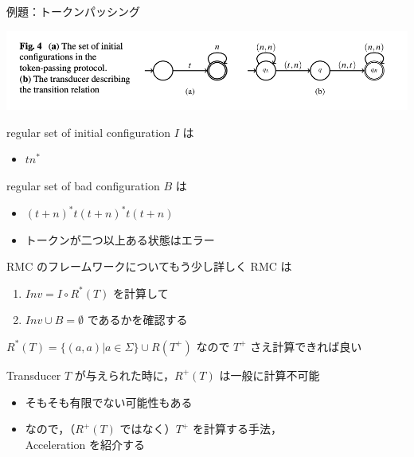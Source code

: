 \documentclass[presentation, xetex]{beamer}
\begin{document}
\begin{frame}[label={sec:org3bc9293}]{例題：トークンパッシング}
\begin{center}
\includegraphics[width=.9\linewidth]{./images/token-example.png}
\end{center}


regular set of initial configuration \(I\) は
\begin{itemize}
\item \(t n^*\)
\end{itemize}


regular set of bad configuration \(B\) は
\begin{itemize}
\item \((t + n)^* t (t + n)^* t (t + n)\)
\item トークンが二つ以上ある状態はエラー
\end{itemize}
\end{frame}



\begin{frame}[label={sec:org5da6469}]{RMC のフレームワークについてもう少し詳しく}
RMC は
\begin{enumerate}
\item \(Inv = I \circ R^*(T)\) を計算して
\item \(Inv \cup B = \emptyset\) であるかを確認する
\end{enumerate}


\(R^*(T) = \{(a, a) | a \in \Sigma\} \cup R(T^+)\) なので
\alert{\alert{\(T^+\) さえ計算できれば良い}}


Transducer \(T\) が与えられた時に，\(R^+(T)\) は一般に計算不可能
\begin{itemize}
\item そもそも有限でない可能性もある
\item なので，（\(R^+(T)\) ではなく）\(T^+\) を計算する手法，\\
\alert{\alert{Acceleration}} を紹介する
\end{itemize}
\end{frame}
\end{document}
